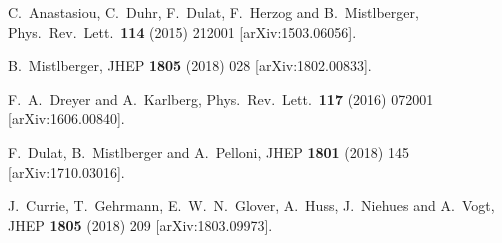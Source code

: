 \documentclass[12pt]{article}
\begin{document}
\begin{thebibliography}{99}
  C.~Anastasiou, C.~Duhr, F.~Dulat, F.~Herzog and B.~Mistlberger,
  Phys.\ Rev.\ Lett.\  {\bf 114} (2015) 212001
   [arXiv:1503.06056].


  B.~Mistlberger,
  JHEP {\bf 1805} (2018) 028
   [arXiv:1802.00833].


  F.~A.~Dreyer and A.~Karlberg,
  Phys.\ Rev.\ Lett.\  {\bf 117} (2016) 072001
  [arXiv:1606.00840].




  F.~Dulat, B.~Mistlberger and A.~Pelloni,
  JHEP {\bf 1801} (2018) 145
   [arXiv:1710.03016].
  
  J.~Currie, T.~Gehrmann, E.~W.~N.~Glover, A.~Huss, J.~Niehues and A.~Vogt,
  JHEP {\bf 1805} (2018) 209
   [arXiv:1803.09973].

  


  

\end{thebibliography}
\end{document}
